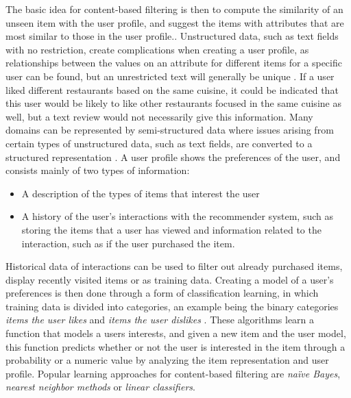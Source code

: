 \noindent
The basic idea for content-based filtering is then to compute the similarity of an unseen item with the user profile, and suggest the items with attributes that are most similar to those in the user profile..
Unstructured data, such as text fields with no restriction, create complications when creating a user profile, as relationships between the values on an attribute for different items for a specific user can be found, but an unrestricted text will generally be unique \cite{ContentBasedFiltering}. 
If a user liked different restaurants based on the same cuisine, it could be indicated that this user would be likely to like other restaurants focused in the same cuisine as well, but a text review would not necessarily give this information.
Many domains can be represented by semi-structured data where issues arising from certain types of unstructured data, such as text fields, are converted to a structured representation \cite{ContentBasedFiltering}.
A user profile shows the preferences of the user, and consists mainly of two types of information:
\begin{itemize}
    \item A description of the types of items that interest the user
    \item A history of the user's interactions with the recommender system, such as storing the items that a user has viewed and information related to the interaction, such as if the user purchased the item.
\end{itemize}
Historical data of interactions can be used to filter out already purchased items, display recently visited items or as training data.
Creating a model of a user's preferences is then done through a form of classification learning, in which training data is divided into categories, an example being the binary categories \textit{items the user likes} and \textit{items the user dislikes} \cite{ContentBasedFiltering}.
These algorithms learn a function that models a users interests, and given a new item and the user model, this function predicts whether or not the user is interested in the item through a probability or a numeric value by analyzing the item representation and user profile.
Popular learning approaches for content-based filtering are \textit{naïve Bayes}, \textit{nearest neighbor methods} or \textit{linear classifiers}.

